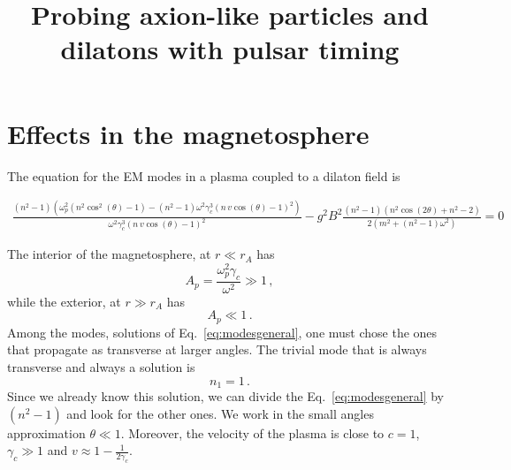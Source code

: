 \documentclass[preprintnumbers,nofootinbib,prd,superscriptaddress,groupedaddress,aps]{revtex4-1} %
\begin{document}
\title{Probing axion-like particles and dilatons with pulsar timing}

%

\section{Effects in the magnetosphere}
The equation for the EM modes in a plasma coupled to a dilaton field is
\begin{widetext}
	\begin{flushleft}
\begin{align}\label{eq:modesgeneral}
\frac{\left(n^2-1\right) \left(\omega_p^2 \left(n^2 \cos ^2(\theta )-1\right)-\left(n^2-1\right) \omega ^2 \gamma _c^3 (n \,v \cos (\theta )-1)^2\right)}{\omega ^2 \gamma _c^3 (n \, v \cos (\theta )-1)^2}%
-g^2B^2\frac{ \left(n^2-1\right) \left( n^2 \cos (2 \theta )+n^2-2 \right)}{2 \left(m^2+\left(n^2-1\right) \omega ^2\right)}=0
\end{align}
\end{flushleft}
\end{widetext}
The interior of the magnetosphere, at $ r\ll r_A $ has
\begin{equation}\label{key}
A_p=\frac{\omega_p^2 \gamma_c}{\omega^2}\gg 1 \, ,
\end{equation}
while the exterior, at $ r\gg r_A $ has
\begin{equation}\label{key}
A_p \ll 1 \, .
\end{equation}
Among the modes, solutions of Eq.~\eqref{eq:modesgeneral}, one must chose the ones that propagate as transverse at larger angles. The trivial mode that is always transverse and always a solution is
\begin{equation}\label{key}
n_1=1 \, .
\end{equation}
Since we already know this solution, we can divide the Eq.~\eqref{eq:modesgeneral} by $ (n^2 -1) $ and look for the other ones. 
We work in the small angles approximation $ \theta \ll 1 $. Moreover, the velocity of the plasma is close to $ c=1 $, $ \gamma_c\gg 1 $ and $ v \approx 1- \frac{1}{2 \gamma_c} $.
 
\end{document}
